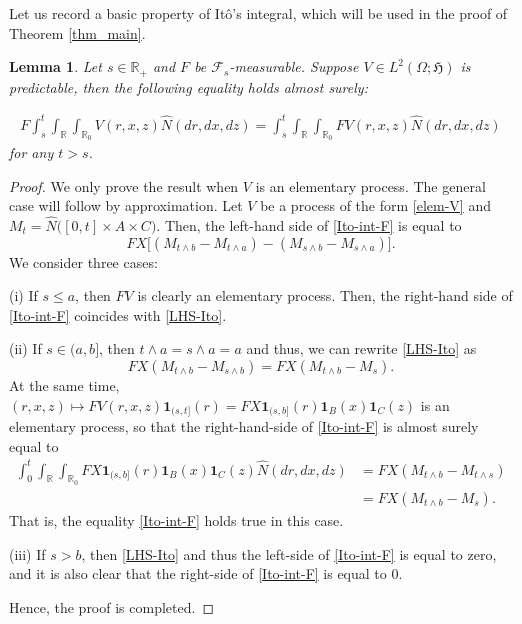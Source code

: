 \documentclass[letterpaper, 11pt,  reqno]{amsart}
\newcommand{\wh}{\widehat}
\newtheorem{lemma}[theorem]{Lemma}
\newcommand{\noi}{\noindent}
\newcommand{\R}{\mathbb{R}}
\newcommand{\F}{\mathcal{F}}
\newcommand{\ind}{\mathbf 1}
\newcommand{\fH}{\mathfrak{H}}
\numberwithin{equation}{section}
\numberwithin{theorem}{section}
\begin{document}
 



\smallskip


Let us record a basic property of It\^o's integral, which will be used in  
 the proof of Theorem \ref{thm_main}.
 
 

\begin{lemma} \label{Ito-int}
Let $s\in\R_+$ and $F$ be   $\F_s$-measurable.
Suppose  $V\in L^2(\Omega; \fH)$ is predictable, then  
the following equality holds almost surely:

\noi
\begin{align}
\label{Ito-int-F}
F \int_s^t \int_{\R} \int_{\R_0} V(r,x,z)\wh{N}(dr,dx,dz)
=
\int_s^t \int_{\R} \int_{\R_0} FV(r,x,z)\wh{N}(dr,dx,dz)
\end{align}
for any $t> s$. 
\end{lemma}

\begin{proof}
We only prove the result when $V$ is an elementary process. 
The general case will follow by approximation.
 Let $V$ be a process of the form \eqref{elem-V}
 and   $M_t=\wh{N}([0,t] \times A \times C\big)$.
 Then,  the left-hand side of \eqref{Ito-int-F} is equal to
\begin{equation}
\label{LHS-Ito}
FX \big[  (M_{t\wedge b}-M_{t \wedge a} )-
 (M_{s\wedge b}-M_{s \wedge a}  )\big].
\end{equation}
We consider three cases: 

\smallskip

\noi
(i) If $s\leq a$, then $FV$ is clearly  an elementary process.
Then,   the right-hand side of \eqref{Ito-int-F} coincides with \eqref{LHS-Ito}. 

\smallskip

\noi
(ii) If $s\in(a,b]$, then   $t\wedge a=s\wedge a=a$ and thus, 
we can rewrite  \eqref{LHS-Ito} as 
\[
F X  (M_{t\wedge b}-M_{s\wedge b} )=FX  (M_{t\wedge b}-M_{s} ).
\]
At the same time, $(r,x,z)\mapsto  FV(r, x, z)\ind_{(s, t]}(r) = FX\ind_{(s, b]}(r)\ind_B(x) \ind_C(z)$
is an elementary process,
so that the right-hand-side of \eqref{Ito-int-F} is almost surely equal to 
\begin{align*}
\int_0^t \int_{\R} \int_{\R_0}FX \ind_{(s,b]}(r)\ind_{B}(x) \ind_{C}(z)\wh{N}(dr,dx,dz)
&=FX (M_{t\wedge b}-M_{t\wedge s}) \\
&=F X (M_{t\wedge b}-M_{s}).
\end{align*}
That is, the equality \eqref{Ito-int-F} holds true in this case. 


\smallskip

\noi
(iii) If $s >b$, then \eqref{LHS-Ito} and thus the left-side of  \eqref{Ito-int-F} 
is equal to zero, and it is also clear that the  right-side of \eqref{Ito-int-F} is  equal to $0$.

\smallskip

Hence, the proof is completed.
\qedhere
\end{proof}
\end{document}
